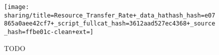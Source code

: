 \begin{figure*}[!htbp]
\begin{center}

\texttt{[image: sharing/title=Resource\_Transfer\_Rate+\_data\_hathash\_hash=e07865a0aee42cf7+\_script\_fullcat\_hash=3612aad527ec4368+\_source\_hash=ffbe01c-clean+ext=]}

\caption{
TODO
}
\label{fig:sharing}
\end{center}
\end{figure*}
